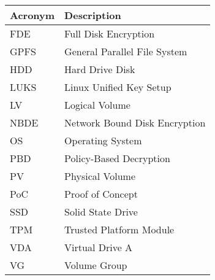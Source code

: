 \addtocounter{table}{-1}
\begin{longtable}{p{}p{}}\hline
\textbf{Acronym} & \textbf{Description}  \\\hline

FDE & Full Disk Encryption \\\hline
GPFS & General Parallel File System \\\hline
HDD & Hard Drive Disk \\\hline
LUKS & Linux Unified Key Setup \\\hline
LV & Logical Volume \\\hline
NBDE & Network Bound Disk Encryption \\\hline
OS & Operating System \\\hline
PBD & Policy-Based Decryption \\\hline
PV & Physical Volume \\\hline
PoC & Proof of Concept \\\hline
SSD & Solid State Drive \\\hline
TPM & Trusted Platform Module \\\hline
VDA & Virtual Drive A \\\hline
VG & Volume Group \\\hline
\end{longtable}
